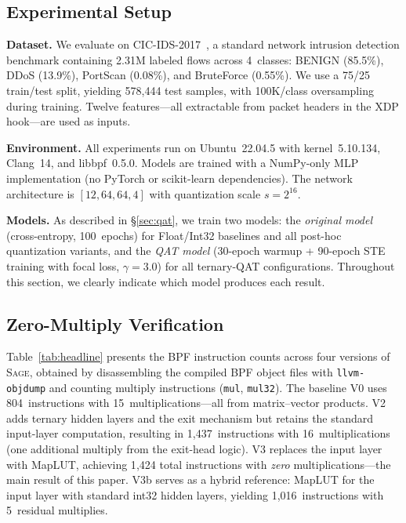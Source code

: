 \documentclass[sigconf,nonacm]{acmart}
\newcommand{\sys}{\textsc{Sage}\xspace}
\begin{document}
\subsection{Experimental Setup}\label{sec:setup}

\textbf{Dataset.}
We evaluate on CIC-IDS-2017~\cite{sharafaldin2018cicids}, a standard
network intrusion detection benchmark containing 2.31M labeled flows
across 4~classes: BENIGN (85.5\%), DDoS (13.9\%), PortScan (0.08\%),
and BruteForce (0.55\%).
We use a 75/25 train/test split, yielding 578{,}444 test samples, with
100K/class oversampling during training.
Twelve features---all extractable from packet headers in the XDP
hook---are used as inputs.

\textbf{Environment.}
All experiments run on Ubuntu~22.04.5 with kernel~5.10.134,
Clang~14, and libbpf~0.5.0.
Models are trained with a NumPy-only MLP implementation (no PyTorch or
scikit-learn dependencies).
The network architecture is $[12, 64, 64, 4]$ with quantization scale
$s = 2^{16}$.

\textbf{Models.}
As described in \S\ref{sec:qat}, we train two models:
the \emph{original model} (cross-entropy, 100~epochs) for Float/Int32
baselines and all post-hoc quantization variants, and the \emph{QAT
model} (30-epoch warmup + 90-epoch STE training with focal loss,
$\gamma = 3.0$) for all ternary-QAT configurations.
Throughout this section, we clearly indicate which model produces each
result.

\subsection{Zero-Multiply Verification}\label{sec:zeromul}

Table~\ref{tab:headline} presents the BPF instruction counts across
four versions of \sys, obtained by disassembling the compiled BPF object
files with \texttt{llvm-objdump} and counting multiply instructions
(\texttt{mul}, \texttt{mul32}).
The baseline V0 uses 804~instructions with 15~multiplications---all from
matrix--vector products.
V2 adds ternary hidden layers and the exit mechanism but retains the
standard input-layer computation, resulting in 1{,}437~instructions with
16~multiplications (one additional multiply from the exit-head logic).
V3 replaces the input layer with MapLUT, achieving 1{,}424 total
instructions with \emph{zero} multiplications---the main result of this
paper.
V3b serves as a hybrid reference: MapLUT for the input layer with
standard int32 hidden layers, yielding 1{,}016~instructions with
5~residual multiplies.
\end{document}
